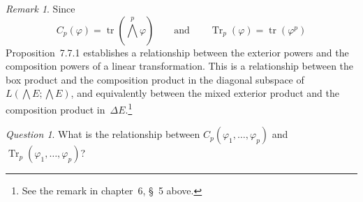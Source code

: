 \documentclass[letterpaper,12pt]{article}
\DeclareMathOperator{\tr}{tr}
\DeclareMathOperator{\Tr}{Tr}
\newcommand{\bigeprod}{\bigwedge}
\newcommand{\medeprod}{{\textstyle\bigeprod}}
\theoremstyle{definition}
\theoremstyle{remark}
\newtheorem*{rmk}{Remark}
\newtheorem*{quest}{Question}
\begin{document}
\begin{rmk}
Since
\[C_p(\varphi)=\tr(\medeprod^p\varphi)\qquad\text{and}\qquad\Tr_p(\varphi)=\tr(\varphi^p)\]
Proposition~7.7.1 establishes a relationship between the exterior powers and the composition powers of a linear transformation. This is a relationship between the box product and the composition product in the diagonal subspace of~\(L(\medeprod E;\medeprod E)\), and equivalently between the mixed exterior product and the composition product in~\(\Delta E\).\footnote{See the remark in chapter~6, \S~5 above.}
\end{rmk}

\begin{quest}
What is the relationship between \(C_p(\varphi_1,\ldots,\varphi_p)\) and \(\Tr_p(\varphi_1,\ldots,\varphi_p)\)?
\end{quest}
\end{document}
